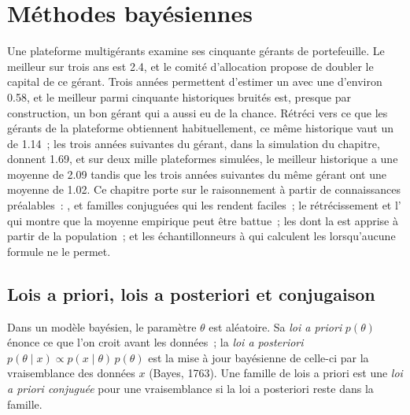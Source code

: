 \chapter{Méthodes bayésiennes}\label{ch:qm:bayesian-methods}

Une plateforme multigérants examine ses cinquante gérants de portefeuille. Le meilleur  sur trois ans est 2.4, et le comité d'allocation
propose de doubler le capital de ce gérant. Trois années permettent d'estimer un  avec une  d'environ 0.58, et le meilleur parmi cinquante
historiques bruités est, presque par construction, un bon gérant qui a aussi eu de la chance. Rétréci vers ce que les gérants de la plateforme obtiennent habituellement,
ce même historique vaut un  de 1.14~; les trois années suivantes du gérant, dans la simulation du chapitre, donnent 1.69, et sur deux
mille plateformes simulées, le meilleur historique a une moyenne de 2.09 tandis que les trois années suivantes du même gérant ont une moyenne de 1.02. Ce chapitre porte sur
le raisonnement à partir de connaissances préalables~: ,  et familles conjuguées qui les rendent faciles~; le rétrécissement et l' qui
montre que la moyenne empirique peut être battue~; les  dont la  est apprise à partir de la population~; et les échantillonneurs à  qui
calculent les  lorsqu'aucune formule ne le permet.

\section{Lois a priori, lois a posteriori et conjugaison}

\begin{definition}\label{def:qm:bayesian-methods:prior}
Dans un modèle bayésien, le paramètre $\theta$ est aléatoire. Sa \emph{loi a priori} $p(\theta)$ énonce ce que l'on croit
avant les données~; la \emph{loi a posteriori} $p(\theta \mid x) \propto p(x \mid \theta)\,
p(\theta)$ est la mise à jour bayésienne de celle-ci par la vraisemblance des données $x$ (Bayes, 1763). Une famille de lois a priori est une \emph{loi a priori
conjuguée} pour une vraisemblance si la loi a posteriori reste dans la famille.
\end{definition}

